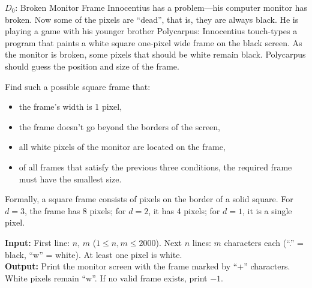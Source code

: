 \documentclass[]{bytedance_seed}
\theoremstyle{plain}
\theoremstyle{definition}
\theoremstyle{remark}
\begin{document}
\begin{problembox}{$D_0$: Broken Monitor Frame}
Innocentius has a problem---his computer monitor has broken. Now some of the pixels are ``dead'', that is, they are always black. He is playing a game with his younger brother Polycarpus: Innocentius touch-types a program that paints a white square one-pixel wide frame on the black screen. As the monitor is broken, some pixels that should be white remain black. Polycarpus should guess the position and size of the frame.

Find such a possible square frame that:
\begin{itemize}[nosep]
\item the frame's width is 1 pixel,
\item the frame doesn't go beyond the borders of the screen,
\item all white pixels of the monitor are located on the frame,
\item of all frames that satisfy the previous three conditions, the required frame must have the smallest size.
\end{itemize}

Formally, a square frame consists of pixels on the border of a solid square. For $d = 3$, the frame has 8 pixels; for $d = 2$, it has 4 pixels; for $d = 1$, it is a single pixel.

\vspace{1.5mm}
\noindent\textbf{Input:} First line: $n$, $m$ ($1 \le n, m \le 2000$). Next $n$ lines: $m$ characters each (``.'' = black, ``w'' = white). At least one pixel is white.\\
\textbf{Output:} Print the monitor screen with the frame marked by ``+'' characters. White pixels remain ``w''. If no valid frame exists, print $-1$.
\end{problembox}
\end{document}
